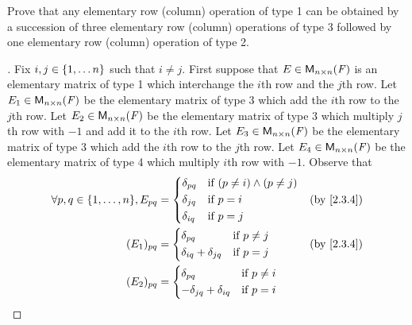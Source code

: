 \begin{ex}\label{ex:3.1.9}
	Prove that any elementary row (column) operation of type 1 can be obtained by a succession of three elementary row (column) operations of type 3 followed by one elementary row (column) operation of type 2.
\end{ex}

\begin{proof}[]
	Fix \(i, j \in \left\lbrace1, \dots n\right\rbrace\) such that \(i \neq j\).
	First suppose that \(E \in \mathsf{M}_{{n} \times n}({\mathit{F}})\) is an elementary matrix of type 1 which interchange the \(i\)th row and the \(j\)th row.
	Let \(E_1 \in \mathsf{M}_{{n} \times n}({\mathit{F}})\) be the elementary matrix of type 3 which add the \(i\)th row to the \(j\)th row.
	Let \(E_2 \in \mathsf{M}_{{n} \times n}({\mathit{F}})\) be the elementary matrix of type 3 which multiply \(j\)th row with \(-1\) and add it to the \(i\)th row.
	Let \(E_3 \in \mathsf{M}_{{n} \times n}({\mathit{F}})\) be the elementary matrix of type 3 which add the \(i\)th row to the \(j\)th row.
	Let \(E_4 \in \mathsf{M}_{{n} \times n}({\mathit{F}})\) be the elementary matrix of type 4 which multiply \(i\)th row with \(-1\).
	Observe that
	\begin{align*}
		\forall p, q \in \set{1, \dots, n}, E_{p q} & = \begin{dcases}
			                                                \delta_{p q} & \text{if } (p \neq i) \land (p \neq j) \\
			                                                \delta_{j q} & \text{if } p = i                       \\
			                                                \delta_{i q} & \text{if } p = j
		                                                \end{dcases} &  & \by{2.3.4} \\
		(E_1)_{p q}                                 & = \begin{dcases}
			                                                \delta_{p q}                & \text{if } p \neq j \\
			                                                \delta_{i q} + \delta_{j q} & \text{if } p = j
		                                                \end{dcases}     &  & \by{2.3.4}     \\
		(E_2)_{p q}                                 & = \begin{dcases}
			                                                \delta_{p q}                 & \text{if } p \neq i \\
			                                                -\delta_{j q} + \delta_{i q} & \text{if } p = i

\end{dcases}
\end{align*}
\end{proof}
